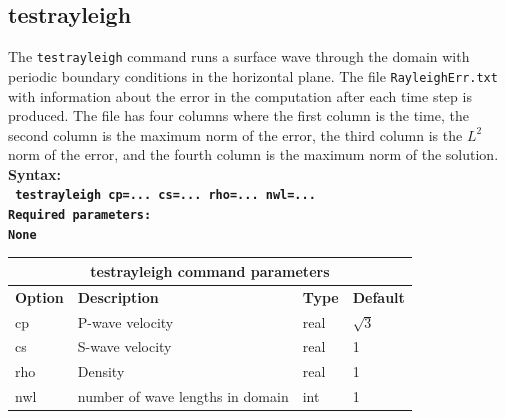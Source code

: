 \documentclass[11pt]{report}
\begin{document}
\subsection{testrayleigh}
\begin{flushleft}
The {\tt testrayleigh} command runs a surface wave through the domain with periodic boundary conditions
in the horizontal plane. The file \verb+RayleighErr.txt+ with information about the error in the computation
after each time step is produced. The file has four columns where the first column is the time, the 
second column is the maximum norm of the error, the third column is the $L^2$ norm of the error, and the 
fourth column is the maximum norm of the solution.
\\
\bf
Syntax:\\
\tt
testrayleigh cp=... cs=... rho=... nwl=...
\\
\bf 
Required parameters:\\
\rm
None
\end{flushleft}
\begin{center}
\begin{tabular}{|l|p{8cm}|l|l|} \hline
\multicolumn{4}{|c|}{\bf testrayleigh command parameters}\\ \hline
\bf{Option} & \bf{Description} & \bf{Type} & \bf{Default} \\ \hline \hline
cp   & P-wave velocity & real & $\sqrt{3}$ \\ \hline
cs   & S-wave velocity & real & 1 \\ \hline
rho  & Density & real & 1 \\ \hline
nwl  & number of wave lengths in domain & int & 1 \\ \hline
\end{tabular}
\end{center}

\end{document}
